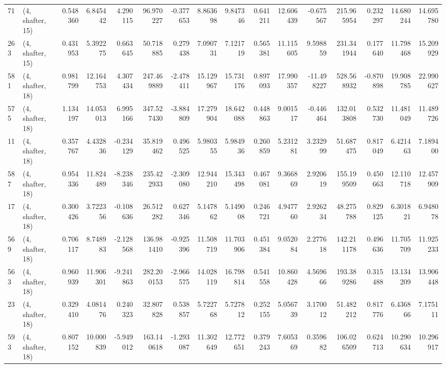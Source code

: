 \begin{tabular}{llrrrrrrrrrrrrrr}
71  &  (4, shafter, 15) &   0.548360 &   6.845442 &   4.290115 &    96.970227 &  -0.377653 &   8.863698 &   9.847346 &  0.641211 &  12.606439 &  -0.675567 &    215.965954 &   0.232297 &  14.680244 &   14.695780 \\
263 &  (4, shafter, 15) &   0.431953 &   5.392275 &   0.663645 &    50.718885 &   0.279438 &   7.090731 &   7.121719 &  0.565381 &  11.115605 &   9.598859 &    231.341944 &   0.177640 &  11.798468 &   15.209929 \\
581 &  (4, shafter, 18) &   0.981799 &  12.164753 &   4.307434 &   247.469889 &  -2.478411 &  15.129967 &  15.731176 &  0.897093 &  17.990357 & -11.498227 &    528.568932 &  -0.870898 &  19.908785 &   22.990627 \\
575 &  (4, shafter, 18) &   1.134197 &  14.053013 &   6.995166 &   347.527430 &  -3.884809 &  17.279904 &  18.642088 &  0.448863 &   9.001517 &  -0.446464 &    132.013808 &   0.532730 &  11.481049 &   11.489726 \\
11  &  (4, shafter, 18) &   0.357767 &   4.432836 &  -0.234129 &    35.819462 &   0.496525 &   5.980355 &   5.984936 &  0.260859 &   5.231281 &   3.232999 &     51.687475 &   0.817049 &   6.421463 &    7.189400 \\
587 &  (4, shafter, 18) &   0.954336 &  11.824489 &  -8.238346 &   235.422933 &  -2.309080 &  12.944210 &  15.343498 &  0.467081 &   9.366869 &   2.920619 &    155.199509 &   0.450663 &  12.110718 &   12.457909 \\
17  &  (4, shafter, 18) &   0.300426 &   3.722356 &  -0.108636 &    26.512282 &   0.627346 &   5.147862 &   5.149008 &  0.246721 &   4.947760 &   2.926234 &     48.275788 &   0.829125 &   6.301821 &    6.948078 \\
569 &  (4, shafter, 18) &   0.706117 &   8.748983 &  -2.128568 &   136.981410 &  -0.925396 &  11.508719 &  11.703906 &  0.451384 &   9.052084 &   2.277618 &    142.211178 &   0.496636 &  11.705709 &   11.925233 \\
563 &  (4, shafter, 18) &   0.960939 &  11.906301 &  -9.241863 &   282.200153 &  -2.966575 &  14.028119 &  16.798814 &  0.541558 &  10.860428 &   4.569666 &    193.389286 &   0.315488 &  13.134209 &   13.906448 \\
23  &  (4, shafter, 18) &   0.329410 &   4.081476 &   0.240323 &    32.807828 &   0.538857 &   5.722768 &   5.727812 &  0.252155 &   5.056739 &   3.170012 &     51.482212 &   0.817776 &   6.436866 &    7.175111 \\
593 &  (4, shafter, 18) &   0.807152 &  10.000839 &  -5.949012 &   163.140618 &  -1.293087 &  11.302649 &  12.772651 &  0.379243 &   7.605369 &   0.359682 &    106.026509 &   0.624713 &  10.290634 &   10.296917 \\

\end{tabular}
